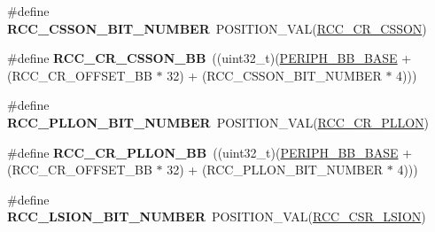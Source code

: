 \begin{DoxyCompactItemize}
\item 
\hypertarget{group___r_c_c___bit_address___alias_region_gaa8a1695db870d271a9e79bf0272ec8b6}{\#define {\bfseries R\-C\-C\-\_\-\-C\-S\-S\-O\-N\-\_\-\-B\-I\-T\-\_\-\-N\-U\-M\-B\-E\-R}~P\-O\-S\-I\-T\-I\-O\-N\-\_\-\-V\-A\-L(\hyperlink{group___peripheral___registers___bits___definition_gacc05308869ad055e1e6f2c32d738aecd}{R\-C\-C\-\_\-\-C\-R\-\_\-\-C\-S\-S\-O\-N})}\label{group___r_c_c___bit_address___alias_region_gaa8a1695db870d271a9e79bf0272ec8b6}

\item 
\hypertarget{group___r_c_c___bit_address___alias_region_ga37c353c62ad303e661e99f20dcc6d1f0}{\#define {\bfseries R\-C\-C\-\_\-\-C\-R\-\_\-\-C\-S\-S\-O\-N\-\_\-\-B\-B}~((uint32\-\_\-t)(\hyperlink{group___peripheral__memory__map_gaed7efc100877000845c236ccdc9e144a}{P\-E\-R\-I\-P\-H\-\_\-\-B\-B\-\_\-\-B\-A\-S\-E} + (R\-C\-C\-\_\-\-C\-R\-\_\-\-O\-F\-F\-S\-E\-T\-\_\-\-B\-B $\ast$ 32) + (R\-C\-C\-\_\-\-C\-S\-S\-O\-N\-\_\-\-B\-I\-T\-\_\-\-N\-U\-M\-B\-E\-R $\ast$ 4)))}\label{group___r_c_c___bit_address___alias_region_ga37c353c62ad303e661e99f20dcc6d1f0}

\item 
\hypertarget{group___r_c_c___bit_address___alias_region_gaed4c77e51cc821b9645cb7874bf5861b}{\#define {\bfseries R\-C\-C\-\_\-\-P\-L\-L\-O\-N\-\_\-\-B\-I\-T\-\_\-\-N\-U\-M\-B\-E\-R}~P\-O\-S\-I\-T\-I\-O\-N\-\_\-\-V\-A\-L(\hyperlink{group___peripheral___registers___bits___definition_gad0e73d5b0a4883e074d40029b49ee47e}{R\-C\-C\-\_\-\-C\-R\-\_\-\-P\-L\-L\-O\-N})}\label{group___r_c_c___bit_address___alias_region_gaed4c77e51cc821b9645cb7874bf5861b}

\item 
\hypertarget{group___r_c_c___bit_address___alias_region_ga0b0a8f171b66cc0d767716ba23ad3c6f}{\#define {\bfseries R\-C\-C\-\_\-\-C\-R\-\_\-\-P\-L\-L\-O\-N\-\_\-\-B\-B}~((uint32\-\_\-t)(\hyperlink{group___peripheral__memory__map_gaed7efc100877000845c236ccdc9e144a}{P\-E\-R\-I\-P\-H\-\_\-\-B\-B\-\_\-\-B\-A\-S\-E} + (R\-C\-C\-\_\-\-C\-R\-\_\-\-O\-F\-F\-S\-E\-T\-\_\-\-B\-B $\ast$ 32) + (R\-C\-C\-\_\-\-P\-L\-L\-O\-N\-\_\-\-B\-I\-T\-\_\-\-N\-U\-M\-B\-E\-R $\ast$ 4)))}\label{group___r_c_c___bit_address___alias_region_ga0b0a8f171b66cc0d767716ba23ad3c6f}

\item 
\hypertarget{group___r_c_c___bit_address___alias_region_ga577ffeb20561aa8395fe5327807b5709}{\#define {\bfseries R\-C\-C\-\_\-\-L\-S\-I\-O\-N\-\_\-\-B\-I\-T\-\_\-\-N\-U\-M\-B\-E\-R}~P\-O\-S\-I\-T\-I\-O\-N\-\_\-\-V\-A\-L(\hyperlink{group___peripheral___registers___bits___definition_ga803cbf97bda1ebaf9afee2a3c9f0851b}{R\-C\-C\-\_\-\-C\-S\-R\-\_\-\-L\-S\-I\-O\-N})}\label{group___r_c_c___bit_address___alias_region_ga577ffeb20561aa8395fe5327807b5709}


\end{DoxyCompactItemize}
